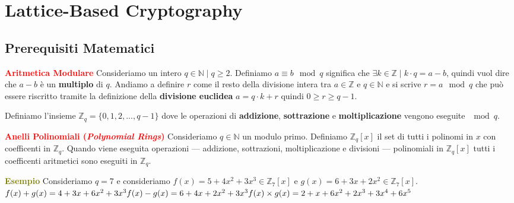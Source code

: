 \chapter{Lattice-Based Cryptography}

\section{Prerequisiti Matematici}

\begin{flushleft}
    \textcolor{red}{\textbf{Aritmetica Modulare}} \newline
    Consideriamo un intero $q \in \mathbb{N} \; | \; q \geq 2$. Definiamo $a \equiv b \mod q$ significa che $\exists k \in \mathbb{Z} \; | \; k \cdot q = a - b$, quindi vuol dire che $a - b$ è un \textbf{multiplo} di $q$. Andiamo a definire $r$ come il resto della divisione intera tra $a \in \mathbb{Z}$ e $q \in \mathbb{N}$ e si scrive $r = a \mod q$ che può essere riscritto tramite la definizione della \textbf{divisione euclidea} $a = q \cdot k + r$ quindi $0 \geq r \geq q - 1$.

    Definiamo l'insieme $\mathbb{Z}_q = \{0, 1, 2, ..., q - 1\}$ dove le operazioni di \textbf{addizione}, \textbf{sottrazione} e \textbf{moltiplicazione} vengono eseguite $\mod q$.
\end{flushleft}

\begin{flushleft}
    \textcolor{red}{\textbf{Anelli Polinomiali (\textit{Polynomial Rings})}} \newline
    Consideriamo $q \in \mathbb{N}$ un modulo primo. Definiamo $\mathbb{Z}_q[x]$ il set di tutti i polinomi in $x$ con coefficenti in $\mathbb{Z}_q$. Quando viene eseguita operazioni --- addizione, sottrazioni, moltiplicazione e divisioni --- polinomiali in $\mathbb{Z}_q[x]$ tutti i coefficenti aritmetici sono eseguiti in $\mathbb{Z}_q$.

    \begin{boxA}
        \textcolor{olive}{\textbf{Esempio}} \newline
        Consideriamo $q = 7$ e consideriamo $f(x) = 5 + 4x^2 + 3x^3 \in \mathbb{Z}_7[x]$ e $g(x) = 6 + 3x + 2x^2 \in \mathbb{Z}_7[x]$.
        \begin{math}
            f(x) + g(x) = 4 + 3x + 6x^2 + 3x^3 \\
            f(x) - g(x) = 6 + 4x + 2x^2 + 3x^3 \\
            f(x) \times g(x) = 2 + x + 6x^2 + 2x^3 + 3x^4 + 6x^5
        \end{math}
    \end{boxA}
\end{flushleft}

